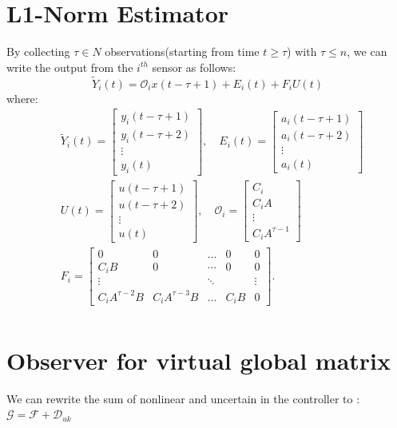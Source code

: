 \documentclass[letterpaper, 10pt, conference]{ieeeconf}  %
\begin{document}
\section{L1-Norm Estimator}
By collecting $ \tau \in N $ observations(starting from time $t \geq \tau$) with $\tau \leq n$, we can write the output from the $i^{th}$ sensor as follows:
$$
\widetilde{Y}_i(t)=\mathcal{O}_i x(t-\tau+1)+E_i(t)+F_i U(t)
$$
where:
$$
\begin{aligned}
& \tilde{Y}_i(t)=\left[\begin{array}{c}
y_i(t-\tau+1) \\
y_i(t-\tau+2) \\
\vdots \\
y_i(t)
\end{array}\right], \quad E_i(t)=\left[\begin{array}{c}
a_i(t-\tau+1) \\
a_i(t-\tau+2) \\
\vdots \\
a_i(t)
\end{array}\right] \\
& U(t)=\left[\begin{array}{c}
u(t-\tau+1) \\
u(t-\tau+2) \\
\vdots \\
u(t)
\end{array}\right], \quad \mathcal{O}_i=\left[\begin{array}{c}
C_i \\
C_i A \\
\vdots \\
C_i A^{\tau-1}
\end{array}\right] \\
& F_i=\left[\begin{array}{ccccc}
0 & 0 & \ldots & 0 & 0 \\
C_i B & 0 & \cdots & 0 & 0 \\
\vdots & & \ddots & & \vdots \\
C_i A^{\tau-2} B & C_i A^{\tau-3} B & \ldots & C_i B & 0
\end{array}\right] . \\
&
\end{aligned}
$$
\section{Observer for virtual global matrix}
We can rewrite the sum of nonlinear and uncertain in the controller to : 
    $\mathcal{G} = \mathcal{F} + \mathcal{D}_{uk}$ 
\end{document}
